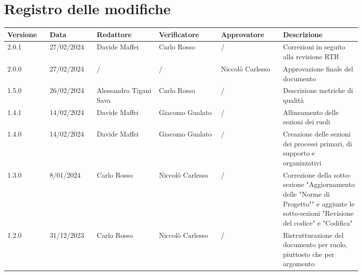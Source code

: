 \section*{Registro delle modifiche}
 {
  \scriptsize
  \begin{tabular}{p{0.10\linewidth}p{0.10\linewidth}p{0.15\linewidth}p{0.15\linewidth}p{0.15\linewidth}p{0.19\linewidth}}
	  \textbf{Versione} & \textbf{Data} & \textbf{Redattore}     & \textbf{Verificatore} & \textbf{Approvatore} & \textbf{Descrizione}                                                                                                                     \\
	  \toprule
	  2.0.1             & 27/02/2024    & Davide Maffei          & Carlo Rosso           & /                    & Correzioni in seguito alla revisione RTB                                                                                                 \\
	  \hline
	  2.0.0             & 27/02/2024    & /                      & /                     & Niccolò Carlesso     & Approvazione finale del documento                                                                                                        \\
	  \hline
	  1.5.0             & 26/02/2024    & Alessandro Tigani Sava & Carlo Rosso           & /                    & Descrizione metriche di qualità                                                                                                          \\
	  \hline
	  1.4.1             & 14/02/2024    & Davide Maffei          & Giacomo Gualato       & /                    & Allineamento delle sezioni dei ruoli                                                                                                     \\
	  \hline
	  1.4.0             & 14/02/2024    & Davide Maffei          & Giacomo Gualato       & /                    & Creazione delle sezioni dei processi primari, di supporto e organizzativi                                                                \\
	  \hline
	  1.3.0             & 8/01/2024     & Carlo Rosso            & Niccolò Carlesso      & /                    & Correzione della sotto-sezione "Aggiornamento delle "Norme di Progetto"" e aggiunte le sotto-sezioni "Revisione del codice" e "Codifica" \\
	  \hline
	  1.2.0             & 31/12/2023    & Carlo Rosso            & Niccolò Carlesso      & /                    & Ristrutturazione del documento per ruolo, piuttosto che per argomento                                                                    \\

\end{tabular}}
